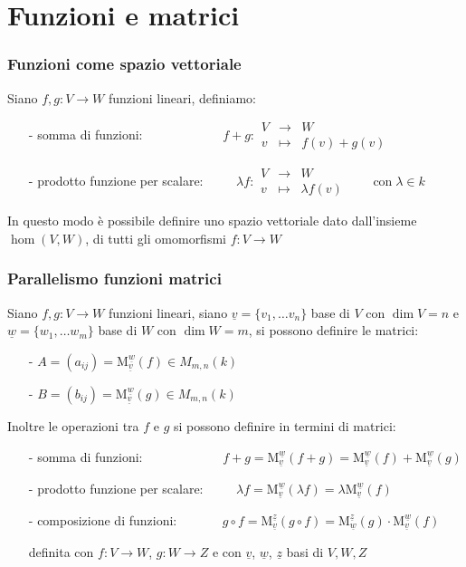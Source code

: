 \documentclass[a4paper]{article}
\newcommand\f[4]{\begin{smallmatrix} {#1} &\to &{#2} \\ {#3} &\mapsto &{#4} \end{smallmatrix}}
\newcommand\m[2]{\text{M}_{\underline{#1}}^{\underline{#2}}}
\begin{document}
\newpage

\section{Funzioni e matrici}
\subsubsection*{Funzioni come spazio vettoriale}
Siano \(f, g: V \to W\) funzioni lineari, definiamo:
\begin{itemize}
	\item[-] somma di funzioni: \(\qquad \qquad \qquad f + g: \f{V}{W}{v}{f(v) + g(v)}\)
	\item[-] prodotto funzione per scalare: \(\qquad \; \lambda f: \f{V}{W}{v}{\lambda f(v)} \qquad \text{con} \; \lambda \in k\)
\end{itemize}
In questo modo è possibile definire uno spazio vettoriale dato dall'insieme \(\hom(V,W)\), di tutti gli omomorfismi \(f: V \to W\)

\subsubsection*{Parallelismo funzioni matrici}
Siano \(f, g: V \to W\) funzioni lineari, siano \(\underline{v} = \{ v_1, \dots v_n \}\) base di \(V\) con \(\dim V = n\) e
\(\underline{w} = \{ w_1, \dots w_m \}\) base di \(W\) con \(\dim W = m\), si possono definire le matrici:
\begin{itemize}
	\item[-] \(A = (a_{ij}) = \m{v}{w}(f) \in M_{m,n}(k)\)
	\item[-] \(B = (b_{ij}) = \m{v}{w}(g) \in M_{m,n}(k)\)
\end{itemize}
Inoltre le operazioni tra \(f\) e \(g\) si possono definire in termini di matrici:
\begin{itemize}
	\item[-] somma di funzioni: \(\qquad \qquad \qquad f + g = \m{v}{w}(f + g) = \m{v}{w}(f) + \m{v}{w}(g)\)
	\item[-] prodotto funzione per scalare: \(\qquad \;\lambda f = \m{v}{w}(\lambda f) = \lambda \m{v}{w}(f)\)
	\item[-] composizione di funzioni: \(\qquad \quad \; g \circ f = \m{v}{z}(g \circ f) = \m{w}{z}(g) \cdot \m{v}{w}(f)\)
	\item[] definita con \(f: V \to W\), \(g: W \to Z\) e con \(\underline{v}\), \(\underline{w}\), \(\underline{z}\) basi di \(V, W, Z\)
\end{itemize}
\end{document}
